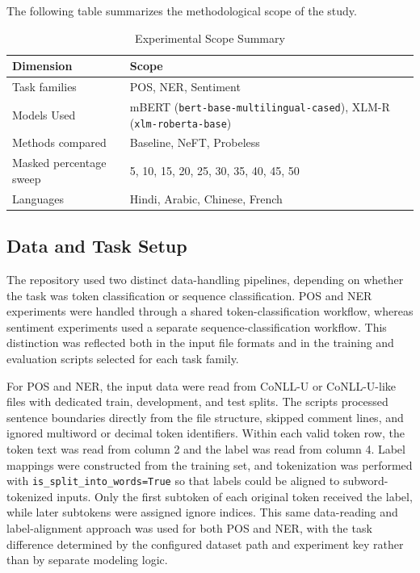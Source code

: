\documentclass[12pt]{article}
\begin{document}
The following table summarizes the methodological scope of the study.

\begin{table}[H]
\centering
\caption{Experimental Scope Summary}
\label{tab:experimental_scope}
\begin{tabular}{|p{5.5cm}|p{8cm}|}
\hline
\textbf{Dimension} & \textbf{Scope} \\
\hline
Task families & POS, NER, Sentiment \\
\hline
Models Used & mBERT (\texttt{bert-base-multilingual-cased}), XLM-R (\texttt{xlm-roberta-base}) \\
\hline
Methods compared & Baseline, NeFT, Probeless \\
\hline
Masked percentage sweep & 5, 10, 15, 20, 25, 30, 35, 40, 45, 50 \\
\hline
Languages & Hindi, Arabic, Chinese, French \\
\hline
\end{tabular}
\end{table}

\subsection{Data and Task Setup}

The repository used two distinct data-handling pipelines, depending on whether the task was token classification or sequence classification. POS and NER experiments were handled through a shared token-classification workflow, whereas sentiment experiments used a separate sequence-classification workflow. This distinction was reflected both in the input file formats and in the training and evaluation scripts selected for each task family.

For POS and NER, the input data were read from CoNLL-U or CoNLL-U-like files with dedicated train, development, and test splits. The scripts processed sentence boundaries directly from the file structure, skipped comment lines, and ignored multiword or decimal token identifiers. Within each valid token row, the token text was read from column 2 and the label was read from column 4. Label mappings were constructed from the training set, and tokenization was performed with \texttt{is\_split\_into\_words=True} so that labels could be aligned to subword-tokenized inputs. Only the first subtoken of each original token received the label, while later subtokens were assigned ignore indices. This same data-reading and label-alignment approach was used for both POS and NER, with the task difference determined by the configured dataset path and experiment key rather than by separate modeling logic.
\end{document}
